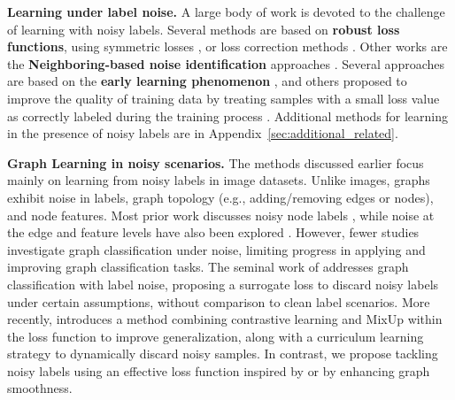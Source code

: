\textbf{Learning under label noise.} A large body of work is devoted to the challenge of learning with noisy labels. Several methods are based on \textbf{robust loss functions}, using symmetric losses \citet{ghosh2017robust}, or loss correction methods \citep{patrini2017making}. Other works are the \textbf{Neighboring-based noise identification} approaches \citep{zhu2022detecting}.
Several approaches are based on the \textbf{early learning phenomenon} \citet{arpit2017closer}, and others proposed to improve the quality of training data by treating samples with a small loss value as correctly labeled during the training process \citep{gui2021towards}. 
Additional methods for learning in the presence of noisy labels are in Appendix~\ref{sec:additional_related}.

\textbf{Graph Learning in noisy scenarios.} 
The methods discussed earlier focus mainly on learning from noisy labels in image datasets. Unlike images, graphs exhibit noise in labels, graph topology (e.g., adding/removing edges or nodes), and node features. Most prior work discusses noisy node labels \citet{graphC1, contrastivelearning5, omg7, ssl8, cl9, nrgnn11,Kang2018RobustGL}, while noise at the edge and feature levels have also been explored \citep{structuralnoise2, structuralnoise3, ssl8}.
However, fewer studies investigate graph classification under noise, limiting progress in applying and improving graph classification tasks. The seminal work of \citet{graphC1} addresses graph classification with label noise, proposing a surrogate loss to discard noisy labels under certain assumptions, without comparison to clean label scenarios. More recently, \citet{omg7} introduces a method combining contrastive learning and MixUp \citet{mixup2} within the loss function to improve generalization, along with a curriculum learning strategy to dynamically discard noisy samples.
In contrast, we propose tackling noisy labels using an effective loss function inspired by \citet{wani2023combining} or by enhancing graph smoothness.


